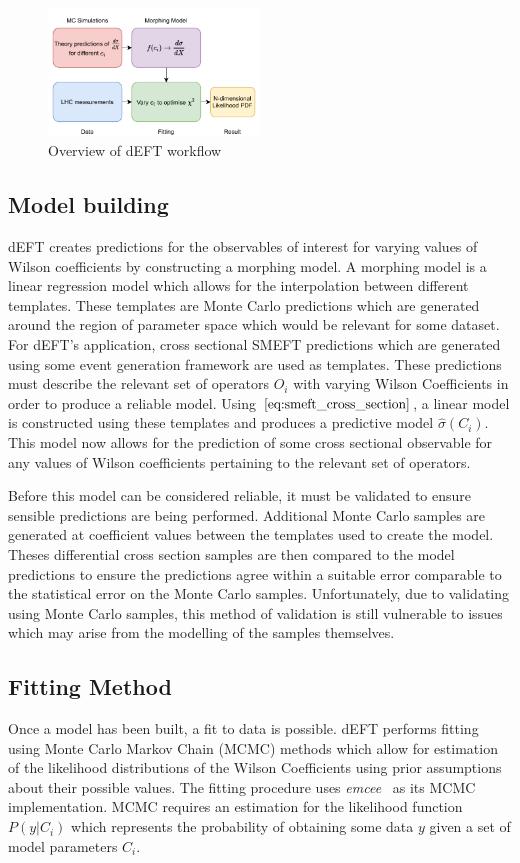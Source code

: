 \documentclass[a4paper,11pt]{article}
\begin{document}
\begin{figure}[htb]
    \centering
    \includegraphics[width=0.5\textwidth]{images/deft-workflow.pdf}
    \caption{Overview of dEFT workflow}
\end{figure}

\subsection{Model building}
dEFT creates predictions for the observables of interest for varying values of Wilson coefficients by constructing a morphing model.
A morphing model is a linear regression model which allows for the interpolation between different templates.
These templates are Monte Carlo predictions which are generated around the region of parameter space which would be relevant for some dataset.
For dEFT's application, cross sectional SMEFT predictions which are generated using some event generation framework are used as templates.
These predictions must describe the relevant set of operators $O_{i}$ with varying Wilson Coefficients in order to produce a reliable model.
Using $\ref{eq:smeft_cross_section}$, a linear model is constructed using these templates and produces a predictive model $\hat{\sigma}({C_i})$.
This model now allows for the prediction of some cross sectional observable for any values of Wilson coefficients pertaining to the relevant set of operators.


Before this model can be considered reliable, it must be validated to ensure sensible predictions are being performed.
Additional Monte Carlo samples are generated at coefficient values between the templates used to create the model.
Theses differential cross section samples are then compared to the model predictions to ensure the predictions agree within a suitable error comparable to the statistical error on the Monte Carlo samples.
Unfortunately, due to validating using Monte Carlo samples, this method of validation is still vulnerable to issues which may arise from the modelling of the samples themselves.

\subsection{Fitting Method}\label{sec:fitting}
Once a model has been built, a fit to data is possible.
dEFT performs fitting using Monte Carlo Markov Chain (MCMC) methods which allow for estimation of the likelihood distributions of the Wilson Coefficients using prior assumptions about their possible values.
The fitting procedure uses \emph{emcee}~\cite{Foreman_Mackey_2013} as its MCMC implementation.
MCMC requires an estimation for the likelihood function $P(y | C_{i})$ which represents the probability of obtaining some data $y$ given a set of model parameters $C_{i}$.
\end{document}
